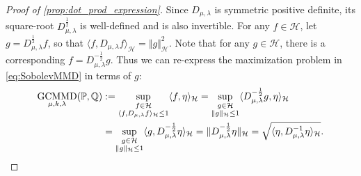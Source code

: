 \documentclass{article}
\newcommand{\h}{\mathcal H}
\newcommand{\PP}{\mathbb P}
\newcommand{\QQ}{\mathbb Q}
\DeclareMathOperator{\GCMMD}{GCMMD}
\begin{document}
\begin{proof}[Proof of \cref{prop:dot_prod_expression}]
Since $D_{\mu,\lambda}$ is symmetric positive definite,
its square-root $D_{\mu,\lambda}^{\frac{1}{2}}$ is well-defined and is also invertible.
For any $f \in \h$,
let $g = D_{\mu,\lambda}^{\frac{1}{2}} f$,
so that $\langle f,D_{\mu,\lambda}f\rangle_{\h}=\Vert g\Vert_{\h}^{2}$.
Note that for any $g \in \h$, there is a corresponding $f = D_{\mu,\lambda}^{-\frac12} g$.
Thus we can re-express the maximization problem in \eqref{eq:SobolevMMD} in terms of $g$:
\begin{align*}
\GCMMD_{\mu,k,\lambda}(\PP,\QQ)
 &:= \sup_{\substack{f \in \h \\ \langle f, D_{\mu,\lambda} f \rangle_\h \leq 1}}
     \langle f, \eta \rangle_{\h}
   =\sup_{\substack{g \in \h \\ \lVert g \rVert_\h \le 1}}
     \langle D_{\mu,\lambda}^{-\frac{1}{2}} g, \eta \rangle_{\h}
\\&= \sup_{\substack{g \in \h \\ \Vert g \Vert_\h \le 1}}
     \langle g, D_{\mu,\lambda}^{-\frac{1}{2}} \eta \rangle_{\h}
   = \lVert D_{\mu,\lambda}^{-\frac{1}{2}} \eta \rVert_{\h}
   = \sqrt{\langle\eta, D_{\mu,\lambda}^{-1} \eta \rangle_{\h}}
.\qedhere\end{align*}
\end{proof}
\end{document}
